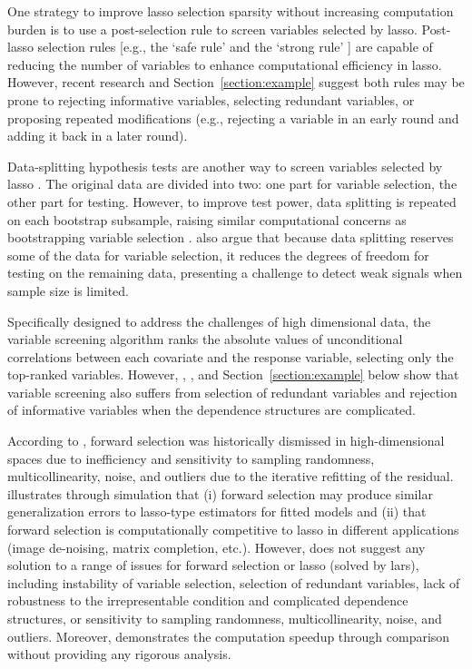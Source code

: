 \documentclass[11pt,review,authoryear]{elsarticle}
\begin{document}
One strategy to improve lasso selection sparsity without increasing computation burden is to use a post-selection rule to screen variables selected by lasso. Post-lasso selection rules [e.g., the `safe rule' \citep{ghaoui2010safe} and the `strong rule' \citep{tibshirani2012strong}] are capable of reducing the number of variables to enhance computational efficiency in lasso. However, recent research \citep{wang2014safe, zeng2017efficient} and Section~\ref{section:example} suggest both rules may be prone to rejecting informative variables, selecting redundant variables, or proposing repeated modifications (e.g., rejecting a variable in an early round and adding it back in a later round).

Data-splitting hypothesis tests are another way to screen variables selected by lasso \citep{wasserman2009high, meinshausen2009p,romano2019multiple, diciccio2020exact}. The original data are divided into two: one part for variable selection, the other part for testing. However, to improve test power, data splitting is repeated on each bootstrap subsample, raising similar computational concerns as bootstrapping variable selection \citep{bach2008bolasso}. \citet{diciccio2020exact} also argue that because data splitting reserves some of the data for variable selection, it reduces the degrees of freedom for testing on the remaining data, presenting a challenge to detect weak signals when sample size is limited.

Specifically designed to address the challenges of high dimensional data, the variable screening algorithm \citep{fan2008sure, hall2009using,hall2009usingb, li2012robust, li2012feature} ranks the absolute values of unconditional correlations between each covariate and the response variable, selecting only the top-ranked variables. However, \citet{fan2008sure}, \citet{barut2016conditional}, and Section~\ref{section:example} below show that variable screening also suffers from selection of redundant variables and rejection of informative variables when the dependence structures are complicated.

According to \citet{friedman2001elements, weisberg04}, forward selection was historically dismissed in high-dimensional spaces due to inefficiency and sensitivity to sampling randomness, multicollinearity, noise, and outliers due to the iterative refitting of the residual. \citet{tibshirani2015general} illustrates through simulation that (i) forward selection may produce similar generalization errors to lasso-type estimators for fitted models and (ii) that forward selection is computationally competitive to lasso in different applications (image de-noising, matrix completion, etc.). However, \citet{tibshirani2015general} does not suggest any solution to a range of issues for forward selection or lasso (solved by lars), including instability of variable selection, selection of redundant variables, lack of robustness to the irrepresentable condition and complicated dependence structures, or sensitivity to sampling randomness, multicollinearity, noise, and outliers. Moreover, \citet{tibshirani2015general} demonstrates the computation speedup through comparison without providing any rigorous analysis.
\end{document}
